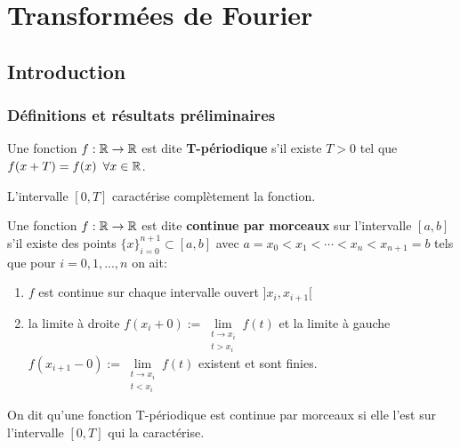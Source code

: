 \chapter{Transformées de Fourier}


\section{Introduction}


\subsection{Définitions et résultats préliminaires}

\begin{definition}
    Une fonction $f: \mathbb{R} \rightarrow \mathbb{R}$ est dite \textbf{T-périodique} s'il existe $T > 0$ tel que $f(x + T) = f(x) \enspace \forall x \in \mathbb{R}$.
    
    L'intervalle $[0, T]$ caractérise complètement la fonction.
\end{definition}


\begin{definition}[14.1.i, p.103]

    Une fonction $f: \mathbb{R} \rightarrow \mathbb{R}$ est dite \textbf{continue par morceaux} sur l'intervalle $[a, b]$ s'il existe des points $ \{x\}_{i = 0}^{n + 1} \subset [a, b]$ avec $a = x_0 < x_1 < \cdots < x_n < x_{n + 1} = b$ tels que pour $i = 0, 1, ..., n$ on ait:
    
    \begin{enumerate}

        \item
        $f$ est continue sur chaque intervalle ouvert $]x_i, x_{i + 1}[$

        \item
        la limite à droite $f(x_i + 0) := \lim\limits_{\substack{t \rightarrow x_i \\ t > x_i}} f(t)$ et la limite à gauche $f(x_{i + 1} - 0) := \lim\limits_{\substack{t \rightarrow x_i \\ t < x_i}} f(t)$ existent et sont finies.

    \end{enumerate}

\end{definition}


\begin{terminology}
    On dit qu'une fonction T-périodique est continue par morceaux si elle l'est sur l'intervalle $[0, T]$ qui la caractérise.
\end{terminology}



